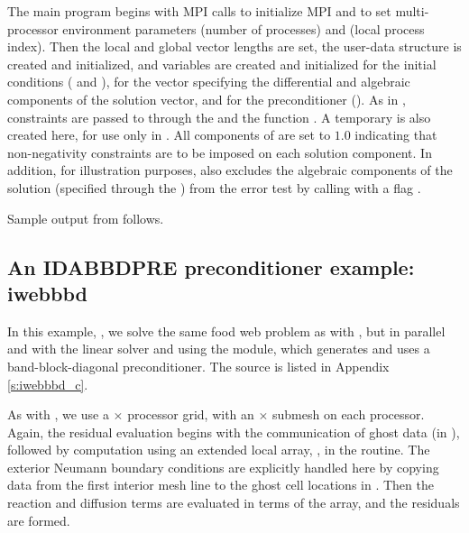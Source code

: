The  main program begins with MPI calls to initialize MPI and to
set multi-processor environment parameters  (number of processes) and
 (local process index).  Then the local and global vector lengths
are set, the user-data structure  is created and initialized, and
 variables are created and initialized for the initial conditions
( and ), for the vector  specifying the differential 
and algebraic components of the solution vector, and for the preconditioner
().  As in , constraints are passed to {\ida} through the
  and the function .  
A temporary   is also created here, for use only in
.
All components of  are set to $1.0$ indicating that
non-negativity constraints are to be imposed on each solution component.  
In addition, for illustration purposes,  also excludes the
algebraic components of the solution (specified through the 
) from the error test by calling  with a
flag .

Sample output from  follows.


\subsection{An IDABBDPRE preconditioner example: iwebbbd}\label{ss:iwebbbd}

In this example, , we solve the same food web problem as with
, but in parallel and with the {\idaspgmr} linear solver and
using the {\idabbdpre} module, which generates and uses a band-block-diagonal 
preconditioner.  The source is listed in Appendix \ref{s:iwebbbd_c}.

As with , we use a  $\times$  processor grid, with
an  $\times$  submesh on each processor.  Again, the residual
evaluation begins with the communication of ghost data (in ),
followed by computation using an extended local array, , in the
 routine.
The exterior Neumann boundary conditions are explicitly handled here
by copying data from the first interior mesh line to the ghost cell
locations in .  Then the reaction and diffusion terms are
evaluated in terms of the  array, and the residuals are formed.

